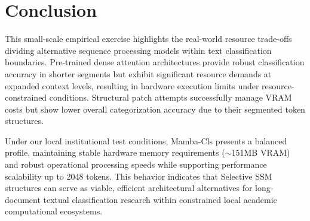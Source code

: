 \documentclass[runningheads]{llncs}
\begin{document}
\section{Conclusion}
This small-scale empirical exercise highlights the real-world resource trade-offs dividing alternative sequence processing models within text classification boundaries. Pre-trained dense attention architectures provide robust classification accuracy in shorter segments but exhibit significant resource demands at expanded context levels, resulting in hardware execution limits under resource-constrained conditions. Structural patch attempts successfully manage VRAM costs but show lower overall categorization accuracy due to their segmented token structures.

Under our local institutional test conditions, Mamba-Cls presents a balanced profile, maintaining stable hardware memory requirements ($\sim$151MB VRAM) and robust operational processing speeds while supporting performance scalability up to 2048 tokens. This behavior indicates that Selective SSM structures can serve as viable, efficient architectural alternatives for long-document textual classification research within constrained local academic computational ecosystems.
\end{document}

